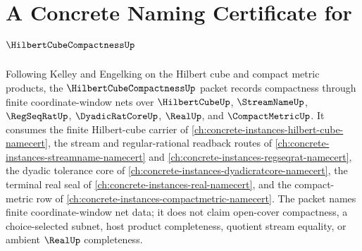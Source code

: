 \chapter{A Concrete Naming Certificate for $\HilbertCubeCompactnessUp$}
\label{ch:concrete-instances-hilbert-cube-compactness-namecert}

Following Kelley and Engelking on the Hilbert cube and compact metric products, the $\HilbertCubeCompactnessUp$ packet records compactness through finite coordinate-window nets over $\HilbertCubeUp$, $\StreamNameUp$, $\RegSeqRatUp$, $\DyadicRatCoreUp$, $\RealUp$, and $\CompactMetricUp$. It consumes the finite Hilbert-cube carrier of \autoref{ch:concrete-instances-hilbert-cube-namecert}, the stream and regular-rational readback routes of \autoref{ch:concrete-instances-streamname-namecert} and \autoref{ch:concrete-instances-regseqrat-namecert}, the dyadic tolerance core of \autoref{ch:concrete-instances-dyadicratcore-namecert}, the terminal real seal of \autoref{ch:concrete-instances-real-namecert}, and the compact-metric row of \autoref{ch:concrete-instances-compactmetric-namecert}. The packet names finite coordinate-window net data; it does not claim open-cover compactness, a choice-selected subnet, host product completeness, quotient stream equality, or ambient $\RealUp$ completeness.

